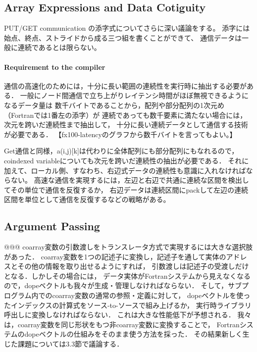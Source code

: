 \subsection{Array Expressions and Data Cotiguity}

PUT/GET communication の添字式についてさらに深い議論をする。
添字には始点、終点、ストライドから成る三つ組を書くことができて、
通信データは一般に連続であるとは限らない。

\paragraph{Requirement to the compiler}
通信の高速化のためには，十分に長い範囲の連続性を実行時に抽出する必要がある．
一般にノード間通信で立ち上がりレイテンシ時間がほぼ無視できるようになるデータ量は
数千バイトであることから，配列や部分配列の1次元め（Fortranでは1番左の添字）が
連続であっても数千要素に満たない場合には，次元を跨いだ連続性まで抽出して，
十分に長い連続データとして通信する技術が必要である．
【fx100-latencyのグラフから数千バイトを言ってもよい。】

Get通信と同様，a(i,j)[k]は代わりに全体配列にも部分配列にもなれるので，
coindexed variableについても次元を跨いだ連続性の抽出が必要である．
それに加えて、ローカル側、すなわち、右辺式データの連続性も意識に入れなければならない。
高速な通信を実現するには，左辺と右辺で共通に連続な区間を検出してその単位で通信を反復するか，
右辺データは連続区間にpackして左辺の連続区間を単位として通信を反復するなどの戦略がある。



\subsection{Argument Passing}
@@@
coarray変数の引数渡しをトランスレータ方式で実現するには大きな選択肢があった．
coarray変数を1つの記述子に変換し，記述子を通して実体のアドレスとその他の情報を取り出せるようにすれば，
引数渡しは記述子の受渡しだけとなる．しかしその場合には，
データ実体がFortranシステムから見えなくなるので，dopeベクトルも我々が生成・管理しなければならない．
そして，サブプログラム内でのcoarray変数の通常の参照・定義に対して，
dopeベクトルを使ったインデックスの計算式をソース-to-ソースで組み上げるか，
実行時ライブラリ呼出しに変換しなければならない．
これは大きな性能低下が予想される．
我々は，coarray変数を同じ形状をもつ非coarray変数に変換することで，
Fortranシステムのdopeベクトルの仕組みをそのまま使う方法を採った．
その結果新しく生じた課題については3.3節で議論する．


